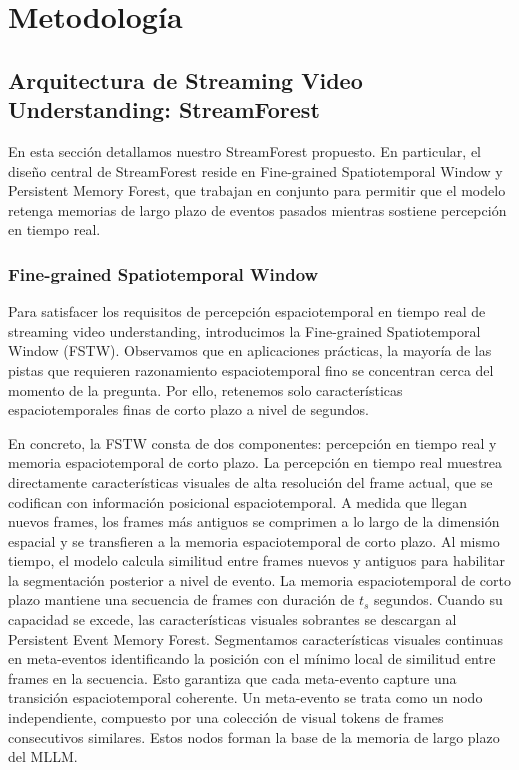 \section{Metodología}
\label{sec:Methodology}


\subsection{Arquitectura de Streaming Video Understanding: StreamForest}

En esta sección detallamos nuestro StreamForest propuesto. En particular, el diseño central de StreamForest reside en Fine-grained Spatiotemporal Window y Persistent Memory Forest, que trabajan en conjunto para permitir que el modelo retenga memorias de largo plazo de eventos pasados mientras sostiene percepción en tiempo real.


\subsubsection{Fine-grained Spatiotemporal Window}


Para satisfacer los requisitos de percepción espaciotemporal en tiempo real de streaming video understanding, introducimos la Fine-grained Spatiotemporal Window (FSTW). Observamos que en aplicaciones prácticas, la mayoría de las pistas que requieren razonamiento espaciotemporal fino se concentran cerca del momento de la pregunta. Por ello, retenemos solo características espaciotemporales finas de corto plazo a nivel de segundos. 

En concreto, la FSTW consta de dos componentes: percepción en tiempo real y memoria espaciotemporal de corto plazo. La percepción en tiempo real muestrea directamente características visuales de alta resolución del frame actual, que se codifican con información posicional espaciotemporal. A medida que llegan nuevos frames, los frames más antiguos se comprimen a lo largo de la dimensión espacial y se transfieren a la memoria espaciotemporal de corto plazo. Al mismo tiempo, el modelo calcula similitud entre frames nuevos y antiguos para habilitar la segmentación posterior a nivel de evento. La memoria espaciotemporal de corto plazo mantiene una secuencia de frames con duración de $t_s$ segundos. Cuando su capacidad se excede, las características visuales sobrantes se descargan al Persistent Event Memory Forest. Segmentamos características visuales continuas en meta-eventos identificando la posición con el mínimo local de similitud entre frames en la secuencia. Esto garantiza que cada meta-evento capture una transición espaciotemporal coherente. Un meta-evento se trata como un nodo independiente, compuesto por una colección de visual tokens de frames consecutivos similares. Estos nodos forman la base de la memoria de largo plazo del MLLM.







